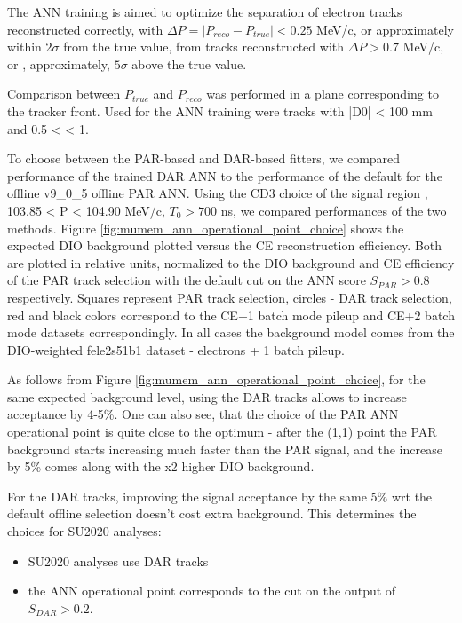 The ANN training is aimed to optimize the separation of electron tracks reconstructed correctly, 
with $\Delta{P} = |P_{reco}-P_{true}| < 0.25$ MeV/c, or approximately within $2\sigma$ from the true
value, from tracks reconstructed with $\Delta{P} > 0.7$ MeV/c, or , approximately, $5\sigma$
above the true value.

Comparison between $P_{true}$ and $P_{reco}$ was performed in a plane corresponding to the
tracker front.
%
Used for the ANN training were tracks with |D0| < 100 mm and 0.5 < \tandip < 1. 

To choose between the PAR-based and DAR-based fitters, we compared performance of the
trained DAR ANN to the performance of the default for the offline v9\_0\_5 offline PAR ANN.
%
Using the CD3 choice of the signal region , 103.85 < P < 104.90 MeV/c, $T_0 > 700$ ns,
we compared performances of the two methods.
%
Figure \ref{fig:mumem_ann_operational_point_choice} shows the expected DIO background plotted
versus the CE reconstruction efficiency. Both are plotted in relative units, normalized
to the DIO background and CE efficiency of the PAR track selection with the default
cut on the ANN score $S_{PAR} > 0.8$ respectively.
%
Squares represent PAR track selection, circles - DAR track selection, red and black colors
correspond to the CE+1 batch mode pileup and CE+2 batch mode datasets correspondingly.
%
In all cases the background model comes from the DIO-weighted fele2s51b1 dataset -
electrons + 1 batch pileup. 

As follows from Figure \ref{fig:mumem_ann_operational_point_choice}, for the same expected 
background level, using the DAR tracks allows to increase acceptance by 4-5\%. One can also see,
that the choice of the PAR ANN operational point is quite close to the optimum - after the 
(1,1) point the PAR background starts increasing much faster than the PAR signal,
and the increase by 5\% comes along with the x2 higher DIO background.

For the DAR tracks, improving the signal acceptance by the same 5\% wrt the default offline
selection doesn't cost extra background. This determines the choices for SU2020 analyses: 

\begin{itemize}
\item
  SU2020 analyses use DAR tracks
\item
  the ANN operational point corresponds to the cut on the output of $S_{DAR} > 0.2$.
\end{itemize}

